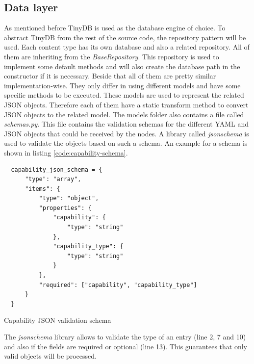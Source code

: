 \subsection{Data layer}
\label{subsection:impl-data-layer}
As mentioned before TinyDB is used as the database engine of choice.
To abstract TinyDB from the rest of the source code, the repository pattern will be used.
Each content type has its own database and also a related repository.
All of them are inheriting from the \textit{BaseRepository}.
This repository is used to implement some default methods and will also create the database path in the constructor if it is necessary.
Beside that all of them are pretty similar implementation-wise.
They only differ in using different models and have some specific methods to be executed.
These models are used to represent the related \ac{JSON} objects.
Therefore each of them have a static transform method to convert \ac{JSON} objects to the related model.
The models folder also contains a file called \textit{schemas.py}.
This file contains the validation schemas for the different \ac{YAML} and \ac{JSON} objects that could be received by the nodes.
A library called \textit{jsonschema} is used to validate the objects based on such a schema.
An example for a schema is shown in listing \ref{code:capability-schema}.
\begin{listing}[H]
  \begin{verbatim}
  capability_json_schema = {
      "type": "array",
      "items": {
          "type": "object",
          "properties": {
              "capability": {
                  "type": "string"
              },
              "capability_type": {
                  "type": "string"
              }
          },
          "required": ["capability", "capability_type"]
      }
  }
  \end{verbatim}
  \caption{Capability JSON validation schema}
  \label{code:capability-schema}
\end{listing}
The \textit{jsonschema} library allows to validate the type of an entry (line 2, 7 and 10) and also if the fields are required or optional (line 13).
This guarantees that only valid objects will be processed.

